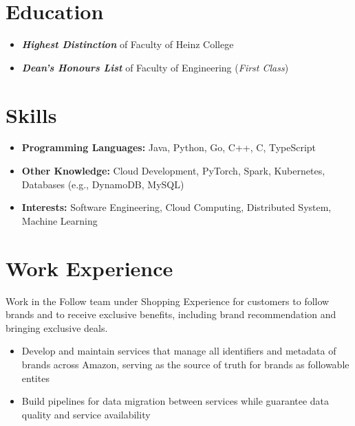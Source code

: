 \documentclass{resume}
\begin{document}



\section{Education}
\begin{itemize}[parsep=0.5ex]
  \item \textbf{\textit{Highest Distinction}} of Faculty of Heinz College
\end{itemize}
\begin{itemize}[parsep=0.5ex]
  \item \textbf{\textit{Dean's Honours List}} of Faculty of Engineering (\textit{First Class})
\end{itemize}

\section{Skills}
\begin{itemize}[parsep=0.5ex]
  \item \textbf{Programming Languages:} Java, Python, Go, C++, C, TypeScript
  \item \textbf{Other Knowledge:} Cloud Development, PyTorch, Spark, Kubernetes, Databases (e.g., DynamoDB, MySQL)
  \item \textbf{Interests:} Software Engineering, Cloud Computing, Distributed System, Machine Learning
\end{itemize}

\section{Work Experience}
\begin{flushleft}
Work in the Follow team under Shopping Experience for customers to follow brands and to receive exclusive benefits, including brand recommendation and bringing exclusive deals.
\begin{itemize}
  \item Develop and maintain services that manage all identifiers and metadata of brands across Amazon, serving as the source of truth for brands as followable entites
  \item Build pipelines for data migration between services while guarantee data quality and service availability
\end{itemize}
\end{flushleft}
\end{document}

